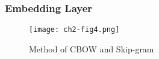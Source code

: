 \subsubsection{Embedding Layer}



\begin{figure}[h]
	\centering
	\texttt{[image: ch2-fig4.png]}
	\caption{Method of CBOW and Skip-gram}
	\label{ch2-fig4}
\end{figure}



